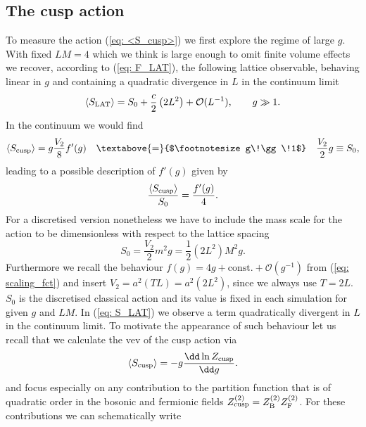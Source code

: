 \subsection{The cusp action}
To measure the action (\ref{eq: <S_cusp>}) we first explore the regime of large $g$. With fixed $LM=4$ which we think is large enough to omit finite volume effects we recover, according to (\ref{eq: F_LAT}), the following lattice observable, behaving linear in $g$ and containing a quadratic divergence in $L$ in the continuum limit
%
%
\begin{equation}
\langle S_{\rm LAT} \rangle = S_{0} + \frac{c}{2} \left(2L^{2}\right) + \mathcal{O}(L^{-1}), \qquad g\gg 1.
\label{eq: S_LAT}
\end{equation}
%
%
In the continuum we would find
%
%
\begin{equation}
\langle S_{\rm cusp} \rangle = g \frac{V_{2}}{8}f'(g)  \quad \textabove{=}{$\footnotesize g\!\gg\!1$} \quad \frac{V_{2}}{2}g \equiv S_{0},
\end{equation}
%
%
leading to a possible description of $f'(g)$ given by
%
%
\begin{equation}
\frac{\langle S_{\rm cusp }\rangle}{S_{0}} = \frac{f'(g)}{4}.
\label{eq: Scusp_fprime}
\end{equation}
%
%
For a discretised version nonetheless we have to include the mass scale for the action to be dimensionless with respect to the lattice spacing
%
%
\begin{equation}
S_{0} = \frac{V_{2}}{2} m^{2}g = \frac{1}{2}\left(2L^{2}\right) M^{2} g.
\end{equation}
%
%
Furthermore we recall the behaviour $f(g) = 4g + \text{const.} + \mathcal{O}(g^{-1})$ from (\ref{eq: scaling_fct}) and insert $V_{2}=a^{2}(TL)=a^{2}(2L^{2})$, since we always use $T=2L$. $S_{0}$ is the discretised classical action and its value is fixed in each simulation for given $g$ and $LM$. In (\ref{eq: S_LAT}) we observe a term quadratically divergent in $L$ in the continuum limit. To motivate the appearance of such behaviour let us recall that we calculate the vev of the cusp action via
%
%
\begin{equation}
 \langle S_{\rm cusp} \rangle = -g \frac{\dd \ln Z_{\rm cusp}}{\dd g}.
 \end{equation} 
and focus especially on any contribution to the partition function that is of quadratic order in the bosonic and fermionic fields  $Z_{\rm cusp}^{(2)}=Z_{\rm B}^{(2)}Z_{\rm F}^{(2)}$. For these contributions we can schematically write
